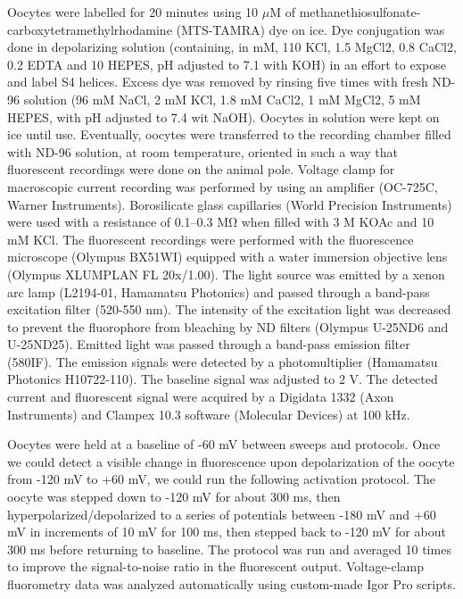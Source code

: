Oocytes were labelled for 20 minutes using 10 $\mu$M of methanethiosulfonate-carboxytetramethylrhodamine (MTS-TAMRA) dye on ice. Dye conjugation was done in depolarizing solution (containing, in mM, 110 KCl, 1.5 MgCl2, 0.8 CaCl2, 0.2 EDTA and 10 HEPES, pH adjusted to 7.1 with KOH) in an effort to expose and label S4 helices. Excess dye was removed by rinsing five times with fresh ND-96 solution (96 mM NaCl, 2 mM KCl, 1.8 mM CaCl2, 1 mM MgCl2, 5 mM HEPES, with pH adjusted to 7.4 wit NaOH). Oocytes in solution were kept on ice until use. Eventually, oocytes were transferred to the recording chamber filled with ND-96 solution, at room temperature, oriented in such a way that fluorescent recordings were done on the animal pole. Voltage clamp for macroscopic current recording was performed by using an amplifier (OC-725C, Warner Instruments). Borosilicate glass capillaries (World Precision Instruments) were used with a resistance of 0.1–0.3 MΩ when filled with 3 M KOAc and 10 mM KCl. The fluorescent recordings were performed with the fluorescence microscope (Olympus BX51WI) equipped with a water immersion objective lens (Olympus XLUMPLAN FL 20x/1.00). The light source was emitted by a xenon arc lamp (L2194-01, Hamamatsu Photonics) and passed through a band-pass excitation filter (520-550 nm). The intensity of the excitation light was decreased to prevent the fluorophore from bleaching by ND filters (Olympus U-25ND6 and U-25ND25). Emitted light was passed through a band-pass emission filter (580IF). The emission signals were detected by a photomultiplier (Hamamatsu Photonics H10722-110). The baseline signal was adjusted to 2 V. The detected current and fluorescent signal were acquired by a Digidata 1332 (Axon Instruments) and Clampex 10.3 software (Molecular Devices) at 100 kHz.

Oocytes were held at a baseline of -60 mV between sweeps and protocols. Once we could detect a visible change in fluorescence upon depolarization of the oocyte from -120 mV to +60 mV, we could run the following activation protocol. The oocyte was stepped down to -120 mV for about 300 ms, then hyperpolarized/depolarized to a series of potentials between -180 mV and +60 mV in increments of 10 mV for 100 ms, then stepped back to -120 mV for about 300 ms before returning to baseline. The protocol was run and averaged 10 times to improve the signal-to-noise ratio in the fluorescent output. Voltage-clamp fluorometry data was analyzed automatically using custom-made Igor Pro scripts.

